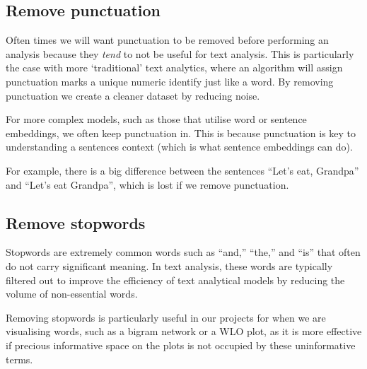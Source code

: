 \documentclass[
  letterpaper,
  DIV=11,
  numbers=noendperiod]{scrreprt}
\begin{document}
\subsection{Remove punctuation}\label{remove-punctuation}

Often times we will want punctuation to be removed before performing an
analysis because they \emph{tend} to not be useful for text analysis.
This is particularly the case with more `traditional' text analytics,
where an algorithm will assign punctuation marks a unique numeric
identify just like a word. By removing punctuation we create a cleaner
dataset by reducing noise.

\begin{tcolorbox}[enhanced jigsaw, colback=white, opacitybacktitle=0.6, coltitle=black, left=2mm, breakable, bottomtitle=1mm, toptitle=1mm, toprule=.15mm, colframe=quarto-callout-tip-color-frame, titlerule=0mm, title=\textcolor{quarto-callout-tip-color}{\faLightbulb}\hspace{0.5em}{Warning on punctuation}, colbacktitle=quarto-callout-tip-color!10!white, rightrule=.15mm, bottomrule=.15mm, arc=.35mm, opacityback=0, leftrule=.75mm]

For more complex models, such as those that utilise word or sentence
embeddings, we often keep punctuation in. This is because punctuation is
key to understanding a sentences context (which is what sentence
embeddings can do).

For example, there is a big difference between the sentences ``Let's
eat, Grandpa'' and ``Let's eat Grandpa'', which is lost if we remove
punctuation.

\end{tcolorbox}

\subsection{Remove stopwords}\label{remove-stopwords}

Stopwords are extremely common words such as ``and,'' ``the,'' and
``is'' that often do not carry significant meaning. In text analysis,
these words are typically filtered out to improve the efficiency of text
analytical models by reducing the volume of non-essential words.

Removing stopwords is particularly useful in our projects for when we
are visualising words, such as a bigram network or a WLO plot, as it is
more effective if precious informative space on the plots is not
occupied by these uninformative terms.
\end{document}
